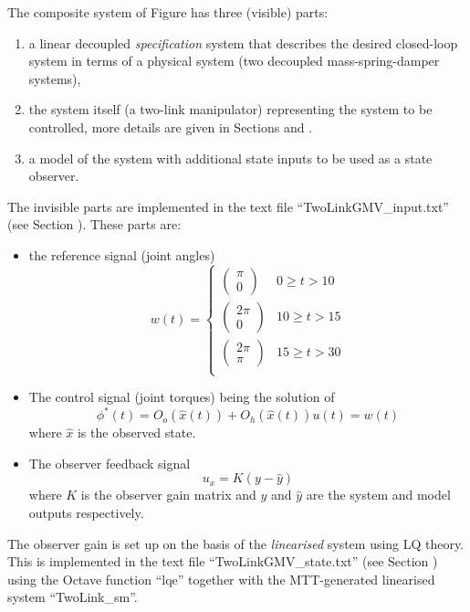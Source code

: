 The composite system of Figure  has three
(visible) parts:
\begin{enumerate}
\item a linear decoupled \emph{specification} system that describes the desired
  closed-loop system in terms of a physical system (two decoupled
  mass-spring-damper systems),
\item the system itself (a two-link manipulator) representing the
  system to be controlled, more details are given in Sections
   and .
\item a model of the system with additional state inputs to be used as
  a state observer.
\end{enumerate}
The invisible parts are implemented in the text file
``TwoLinkGMV\_input.txt'' (see Section ).
These parts are:
\begin{itemize}
\item the reference signal (joint angles)
  \begin{equation}
    w(t) = 
    \begin{cases}
      \begin{pmatrix}
        \pi \\
        0
      \end{pmatrix} & 0 \ge t > 10 \\
      \begin{pmatrix}
        2\pi \\
        0
      \end{pmatrix} & 10 \ge t > 15 \\
      \begin{pmatrix}
        2\pi \\
        \pi
      \end{pmatrix} & 15 \ge t > 30 \\
    \end{cases}
  \end{equation}
\item The control signal (joint torques) being the solution of 
  \begin{equation}
    \phi^*(t) = O_o(\hat x(t)) + O_h(\hat x(t)) u(t) = w(t)
  \end{equation}
where $\hat x$ is the observed state.
\item The observer feedback signal
  \begin{equation}
    u_x = K ( y - \hat y)
  \end{equation}
where $K$ is the observer gain matrix and $y$ and $\hat y$ are the
system and model outputs respectively.
\end{itemize}
The observer gain is set up on the basis of the \emph{linearised}
system using LQ theory. This is implemented in the text file
``TwoLinkGMV\_state.txt'' (see Section )
using the Octave function ``lqe'' together with the MTT-generated
linearised system ``TwoLink\_sm''.



